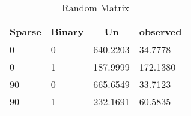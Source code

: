 \documentclass{article}
\theoremstyle{definition}
\begin{document}
\begin{table}[]
\centering
\caption{Random Matrix}
\label{my-label}
\begin{tabular}{|l|l|l|l|}
\hline
\multicolumn{1}{|c|}{\textbf{Sparse}} & \multicolumn{1}{c|}{\textbf{Binary}} & \multicolumn{1}{c|}{\textbf{Un}} & \multicolumn{1}{c|}{\textbf{observed}} \\ \hline
0                                     & 0                                    & 640.2203                         & 34.7778                                \\ \hline
0                                     & 1                                    & 187.9999                         & 172.1380                               \\ \hline
90                                    & 0                                    & 665.6549                         & 33.7123                                \\ \hline
90                                    & 1                                    & 232.1691                         & 60.5835                                \\ \hline
\end{tabular}
\end{table}
\end{document}
